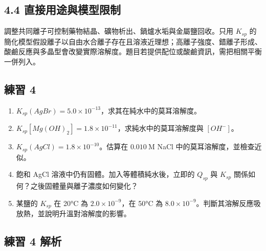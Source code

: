 \documentclass[11pt,a4paper]{article}
\providecommand{\tightlist}{%
  \setlength{\itemsep}{0pt}\setlength{\parskip}{0pt}}
\begin{document}
\subsection{4.4 直接用途與模型限制}\label{ux76f4ux63a5ux7528ux9014ux8207ux6a21ux578bux9650ux5236-1}

調整共同離子可控制藥物結晶、礦物析出、鍋爐水垢與金屬鹽回收。只用 \(K_{sp}\) 的簡化模型假設離子以自由水合離子存在且溶液近理想；高離子強度、錯離子形成、酸鹼反應與多晶型會改變實際溶解度。題目若提供配位或酸鹼資訊，需把相關平衡一併列入。

\subsection{練習 4}\label{ux7df4ux7fd2-4}

\begin{enumerate}
\def\labelenumi{\arabic{enumi}.}
\tightlist
\item
  \(K_{sp}(AgBr)=5.0\times10^{-13}\)，求其在純水中的莫耳溶解度。
\item
  \(K_{sp}[Mg(OH)_2]=1.8\times10^{-11}\)，求純水中的莫耳溶解度與 \([OH^-]\)。
\item
  \(K_{sp}(AgCl)=1.8\times10^{-10}\)。估算在 \(0.010\ \mathrm M\) NaCl 中的莫耳溶解度，並檢查近似。
\item
  飽和 AgCl 溶液中仍有固體。加入等體積純水後，立即的 \(Q_{sp}\) 與 \(K_{sp}\) 關係如何？之後固體量與離子濃度如何變化？
\item
  某鹽的 \(K_{sp}\) 在 20°C 為 \(2.0\times10^{-9}\)，在 50°C 為 \(8.0\times10^{-9}\)。判斷其溶解反應吸放熱，並說明升溫對溶解度的影響。
\end{enumerate}

\subsection{練習 4 解析}\label{ux7df4ux7fd2-4-ux89e3ux6790}
\end{document}
